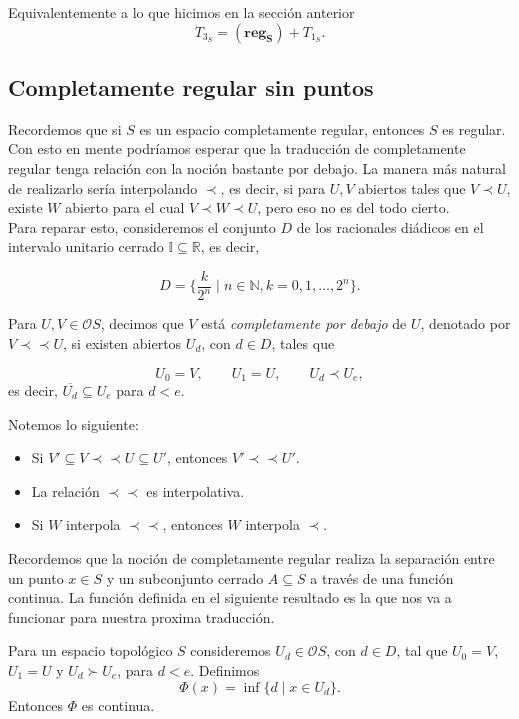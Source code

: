 \documentclass{comunicaciones}
\begin{document}
Equivalentemente a lo que hicimos en la sección anterior 
\[
T_{3_S}=(\mathbf{reg_S})+T_{1_S}.
\]

\subsection{Completamente regular sin puntos}

Recordemos que si $S$ es un espacio completamente regular, entonces $S$ es regular. Con esto en mente podríamos esperar que la traducción de completamente regular tenga relación con la noción bastante por debajo. La manera más natural de realizarlo sería interpolando $\prec$, es decir, si para $U, V$ abiertos tales que $V\prec U$, existe $W$ abierto para el cual $V\prec W \prec U$, pero eso no es del todo cierto.\\

Para reparar esto, consideremos el conjunto $D$ de los racionales diádicos en el intervalo unitario cerrado $\mathbb{I}\subseteq \mathbb{R}$, es decir,

\[
D=\{\frac{k}{2^n}\mid n\in \mathbb{N}, k=0, 1, \dots , 2^n\}.
\]


\begin{dfn}\label{Cdebajo}
    Para $U,V\in \mathcal{O}S$, decimos que $V$ está \emph{completamente por debajo} de $U$, denotado por $V\prec\prec U$, si existen abiertos $U_d$, con $d\in D$, tales que 

    \[
    U_0=V, \qquad U_1=U, \qquad U_d\prec U_e,
    \]
    es decir, $\overline{U_d}\subseteq U_e$ para $d<e$.
\end{dfn}

Notemos lo siguiente:

\begin{itemize}
    \item Si $V'\subseteq V\prec \prec U\subseteq U'$, entonces $V'\prec \prec U'$.
    \item La relación $\prec\prec$ es interpolativa.
    \item Si $W$ interpola $\prec\prec$, entonces $W$ interpola $\prec$.
\end{itemize}

Recordemos que la noción de completamente regular realiza la separación entre un punto $x\in S$ y un subconjunto cerrado $A\subseteq S$ a través de una función continua. La función definida en el siguiente resultado es la que nos va a funcionar para nuestra proxima traducción. 
\begin{prop}\label{Fcontinua}
    Para un espacio topológico $S$ consideremos $U_d\in \mathcal{O}S$, con $d\in D$, tal que $U_0=V$, $U_1=U$ y $U_d\succ U_e$, para $d<e$. Definimos 
    \[
    \Phi(x)=\inf\{d\mid x\in U_d\}.
    \]
    Entonces $\Phi$ es continua.
\end{prop}
\end{document}
